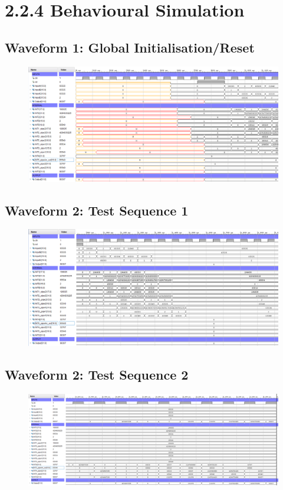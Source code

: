 \documentclass[11pt]{report}
\begin{document}
\section*{2.2.4 Behavioural Simulation}
\subsection*{Waveform 1: Global Initialisation/Reset}
\begin{figure}[H]
    \includegraphics[width=\columnwidth]{Assets/2.2.4_waveform-initial-reset.png}
\end{figure}

\subsection*{Waveform 2: Test Sequence 1}
\begin{figure}[H]
    \includegraphics[width=\columnwidth]{Assets/2.2.4_waveform-test-sequence-1.png}
\end{figure}

\subsection*{Waveform 2: Test Sequence 2}
\begin{figure}[H]
    \includegraphics[width=\columnwidth]{Assets/2.2.4_waveform-test-sequence-2.png}
\end{figure}
\end{document}
